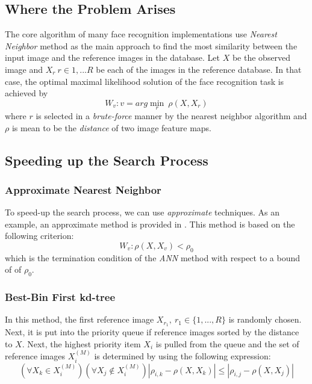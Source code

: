 \subsection{Where the Problem Arises}
The core algorithm of many face recognition implementations use \textit{Nearest Neighbor} method as the main approach to find the most similarity between the input image and the reference images in the database. Let $X$ be the observed image and $X_r \ r\in{1, ... R}$ be each of the images in the reference database. In that case, the optimal maximal likelihood solution of the face recognition task is achieved by
\begin{equation}
	W_v: v = arg\min\limits_{r}\ \rho(X, X_r)
\end{equation}
where $r$ is selected in a \textit{brute-force} manner by the nearest neighbor algorithm and $\rho$ is mean to be the \textit{distance} of two image feature maps.

\subsection{Speeding up the Search Process}
\subsubsection{Approximate Nearest Neighbor}
To speed-up the search process, we can use \textit{approximate} techniques. As an example, an approximate method is provided in \cite{def2}. This method is based on the following criterion:
\begin{equation}
	W_v: \rho(X, X_v) < \rho_0
\end{equation}
which is the termination condition of the \textit{ANN} method with respect to a bound of of $\rho_0$.

\subsubsection{Best-Bin First kd-tree}
In this method, the first reference image $X_{r_1},\ r_1 \in \{1, ... , R\}$ is randomly chosen. Next, it is put into the priority queue if reference images sorted by the distance to $X$. Next, the highest priority item $X_i$ is pulled from the queue and the set of reference images $X_i^{(M)}$ is determined by using the following expression:
\begin{equation}
	(\forall X_k \in X_i^{(M)})(\forall X_j \notin X_i^{(M)})|\rho_{i, k} - \rho(X, X_k)| \leq |\rho_{i, j} - \rho(X, X_j)|
\end{equation}
